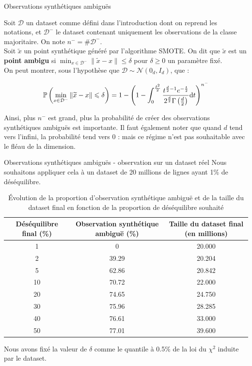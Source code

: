 \documentclass{beamer}
\begin{document}
\begin{frame}{}{Observations synthétiques ambiguës}
	
	Soit $\mathcal{D}$ un dataset comme défini dans l'introduction dont on reprend les notations, et $\mathcal{D}^-$ le dataset contenant uniquement les observations de la classe majoritaire. On note $n^- = \#\mathcal{D}^-$.\\
	Soit $\widetilde{x}$ un point synthétique généré par l'algorithme SMOTE. On dit que $\widetilde{x}$ est un \textbf{point ambigu} si $\displaystyle \min_{x\in \mathcal{D}^-} \|\widetilde{x}-x\| \leqslant \delta$ pour $\delta \geqslant 0$ un paramètre fixé.\\
	
	On peut montrer, sous l'hypothèse que $\mathcal{D}\sim\mathcal{N}(0_d, I_d)$, que :
	
	\begin{equation*}
		\mathbb{P}\left(\displaystyle \min_{x\in \mathcal{D}^-} \|\widetilde{x}-x\| \leqslant \delta \right) = 1 - \left(1 - \int_0^{\frac{\delta^2}{2}} \frac{t^{\frac{d}{2}-1}e^{-\frac{t}{2}}}{2^{\frac{d}{2}}\Gamma\left(\frac{d}{2}\right)} \mathrm{d}t \right)^{n^-}
	\end{equation*}
	
	Ainsi, plus $n^-$ est grand, plus la probabilité de créer des observations synthétiques ambiguës est importante. Il faut également noter que quand $d$ tend vers l'infini, la probabilité tend vers 0 : mais ce régime n'est pas souhaitable avec le fléau de la dimension.
\end{frame}



\begin{frame}{}{Observations synthétiques ambiguës - observation sur un dataset réel}
	Nous souhaitons appliquer cela à un dataset de 20 millions de lignes ayant 1\% de déséquilibre. \newline
	
	\begin{table}
		\centering
		\begin{tabular}{@{}ccc@{}}\toprule
			Déséquilibre final (\%) & Observation synthétique ambiguë (\%) & Taille du dataset final (en millions)\\ \midrule
			1 & 0 & 20.000\\
			2 & 39.29 & 20.204\\
			5 & 62.86 & 20.842\\
			10 & 70.72 & 22.000\\
			20 & 74.65 & 24.750\\
			30 & 75.96 & 28.285\\
			40 & 76.61 & 33.000\\
			50 & 77.01 & 39.600\\ \bottomrule
		\end{tabular}
		\caption{Évolution de la proportion d'observation synthétique ambiguë et de la taille du dataset final en fonction de la proportion de déséquilibre souhaité}
	\end{table}
	
	Nous avons fixé la valeur de $\delta$ comme le quantile à 0.5\% de la loi du $\chi^2$ induite par le dataset.
\end{frame}
\end{document}

